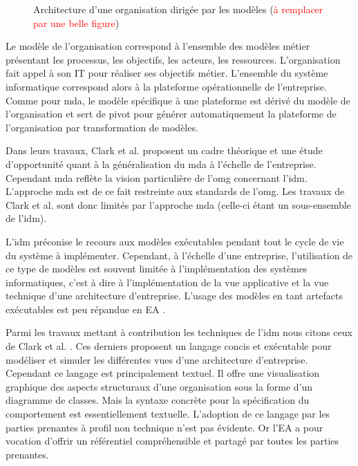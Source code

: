 \begin{figure}[!ht]
    \begin{center}
        
    \end{center}
    \caption{Architecture d'une organisation dirigée par les modèles (\textcolor{red}{à remplacer par une belle figure}) \protect\cite{clark_towards_2014}}
    \label{fig:mdo}
\end{figure}

Le modèle de l'organisation correspond à l'ensemble des modèles métier présentant les processus, les objectifs, les acteurs, les ressources. L'organisation fait appel à son IT pour réaliser ses objectifs métier. L'ensemble du système informatique correspond alors à la plateforme opérationnelle de l'entreprise. Comme pour \gls{mda}, le modèle spécifique à une plateforme est dérivé du modèle de l'organisation et sert de pivot pour générer automatiquement la plateforme de l'organisation par transformation de modèles.

Dans leurs travaux, Clark et al. \cite{clark_towards_2014} proposent un cadre théorique et une étude d'opportunité quant à la généralisation du \gls{mda} à l'échelle de l'entreprise. Cependant \gls{mda} reflète la vision particulière de l'\gls{omg} concernant l'\gls{idm}. L'approche \gls{mda} est de ce fait restreinte aux standards de l'\gls{omg}. Les travaux de Clark et al. sont donc limités par l'approche \gls{mda} (celle-ci étant un sous-ensemble de l'\gls{idm}).

L'\gls{idm} préconise le recours aux modèles exécutables pendant tout le cycle de vie du système à implémenter. Cependant, à l'échelle d'une entreprise, l'utilisation de ce type de modèles est souvent limitée à l'implémentation des systèmes informatiques, c'est à dire à l'implémentation de la vue applicative et la vue technique d'une architecture d'entreprise. L'usage des modèles en tant artefacts exécutables est peu répandue en EA \cite{kulkarni_modelling_2013}.

Parmi les travaux mettant à contribution les techniques de l'\gls{idm} nous citons ceux de Clark et al. \cite{clark2011leap}. Ces derniers proposent un langage concis et exécutable pour modéliser et simuler les différentes vues d'une architecture d'entreprise. Cependant ce langage est principalement textuel. Il offre une visualisation graphique des aspects structuraux d'une organisation sous la forme d'un diagramme de classes. Mais la syntaxe concrète pour la spécification du comportement est essentiellement textuelle. L'adoption de ce langage par les parties prenantes à profil non technique n'est pas évidente. Or l'EA a pour vocation d'offrir un référentiel compréhensible et partagé par toutes les parties prenantes.

